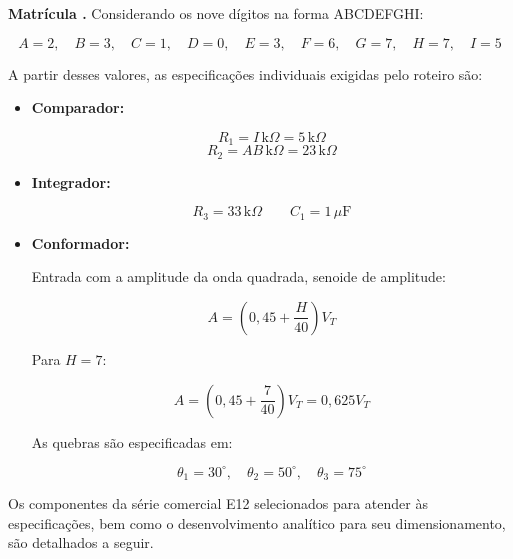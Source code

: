 \documentclass[11pt,a4paper]{article}
\begin{document}
\begin{espec}

\textbf{Matrícula .} Considerando os nove dígitos na forma ABCDEFGHI:

\begin{equation}
A=2,\quad B=3,\quad C=1,\quad D=0,\quad E=3,\quad
F=6,\quad G=7,\quad H=7,\quad I=5
\end{equation}

A partir desses valores, as especificações individuais exigidas pelo roteiro são:

\begin{itemize}

    \item \textbf{Comparador:}

    \[
    R_1=I\,\text{k}\Omega=5\,\text{k}\Omega
    \]
    \[
    R_2=AB\,\text{k}\Omega=23\,\text{k}\Omega
    \]

    \item \textbf{Integrador:}

    \[
    R_3=33\,\text{k}\Omega
    \qquad
    C_1=1\,\mu\text{F}
    \]

    \item \textbf{Conformador:}

    Entrada com a amplitude da onda quadrada, senoide de amplitude:

    \[
    A=\left(0{,}45+\frac{H}{40}\right)V_T
    \]

    Para $H=7$:

    \[
    A=\left(0{,}45+\frac{7}{40}\right)V_T
    =0{,}625V_T
    \]

    As quebras são especificadas em:

    \[
    \theta_1=30^\circ,\quad
    \theta_2=50^\circ,\quad
    \theta_3=75^\circ
    \]

\end{itemize}

\end{espec}

Os componentes da série comercial E12 selecionados para atender às especificações, bem como o desenvolvimento analítico para seu dimensionamento, são detalhados a seguir.
\end{document}
